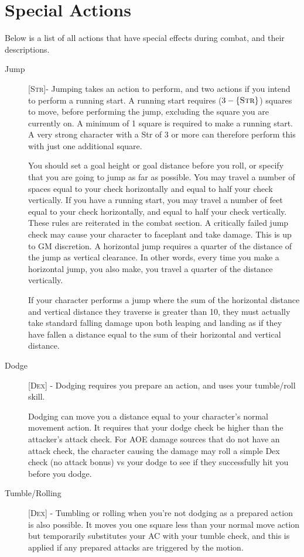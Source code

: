 \section{Special Actions}
Below is a list of all actions that have special effects during combat, and their descriptions.
\begin{description}
\item[Jump] [\textsc{Str}]- Jumping takes an action to perform, and two actions if you intend to perform a running start. A running start requires ($3 - \{ \textsc{Str} \}$) squares to move, before performing the jump, excluding the square you are currently on. A minimum of 1 square is required to make a running start. A very strong character with a Str of 3 or more can therefore perform this with just one additional square.

You should set a goal height or goal distance before you roll, or specify that you are going to jump as far as possible. You may travel a number of spaces equal to your check horizontally and equal to half your check vertically. If you have a running start, you may travel a number of feet equal to your check horizontally, and equal to half your check vertically. These rules are reiterated in the combat section. A critically failed jump check may cause your character to faceplant and take damage. This is up to GM discretion. A horizontal jump requires a quarter of the distance of the jump as vertical clearance. In other words, every time you make a horizontal jump, you also make, you travel a quarter of the distance vertically.

If your character performs a jump where the sum of the horizontal distance and vertical distance they traverse is greater than 10, they must actually take standard falling damage upon both leaping and landing as if they have fallen a distance equal to the sum of their horizontal and vertical distance.

\item[Dodge] [\textsc{Dex}] - Dodging requires you prepare an action, and uses your tumble/roll skill.

Dodging can move you a distance equal to your character’s normal movement action. It requires that your dodge check be higher than the attacker’s attack check. For AOE damage sources that do not have an attack check, the character causing the damage may roll a simple Dex check (no attack bonus) vs your dodge to see if they successfully hit you before you dodge.

\item[Tumble/Rolling] [\textsc{Dex}] - Tumbling or rolling when you’re not dodging as a prepared action is also possible. It moves you one square less than your normal move action but temporarily substitutes your AC with your tumble check, and this is applied if any prepared attacks are triggered by the motion.


\end{description}
